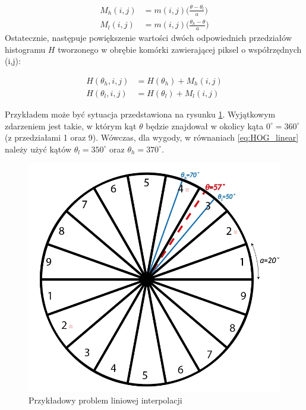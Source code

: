 \begin{equation}
\label{eq:HOG_linear}
\left.\begin{aligned}
M_h(i,j)&=m(i,j)\bigg(\frac{\theta-\theta_l}{a}\bigg)\\
M_l(i,j)&=m(i,j)\bigg(\frac{\theta_h-\theta}{a}\bigg)
\end{aligned}\right.
\end{equation}
Ostatecznie, następuje powiększenie wartości dwóch odpowiednich przedziałów histogramu $H$ tworzonego w obrębie komórki zawierającej piksel o współrzędnych (i,j):

\begin{equation}
\label{eq:HOG_increment}
\left.\begin{aligned} 
H(\theta_h,i,j)&=H(\theta_h)+M_h(i,j) \\ 
H(\theta_l,i,j)&=H(\theta_l)+M_l(i,j)
\end{aligned}\right.
\end{equation}

Przykładem może być sytuacja przedstawiona na rysunku \ref{fig:HOG_interpolation}. Wyjątkowym zdarzeniem jest takie, w którym kąt $\theta$ będzie znajdował w okolicy kąta $0^{\circ}=360^{\circ}$ (z przedziałami 1 oraz 9). Wówczas, dla wygody, w równaniach \ref{eq:HOG_linear} należy użyć kątów $\theta_l=350^{\circ}$ oraz $\theta_h=370^{\circ}$.

\begin{figure}[h]
	\centering
	\hspace*{1cm}
	\includegraphics[width=12cm]{2_HOG_interpolation.jpg}
	\caption{Przykładowy problem liniowej interpolacji}
	\label{fig:HOG_interpolation}
\end{figure}

